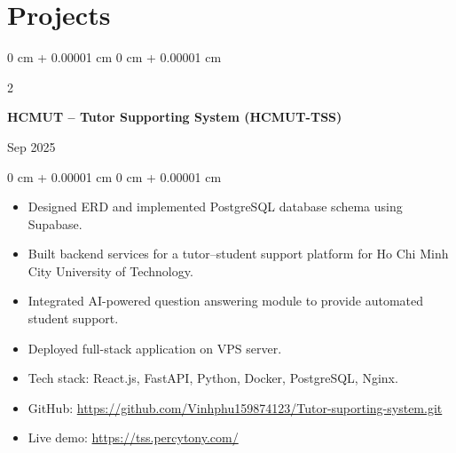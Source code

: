 \documentclass[10pt, letterpaper]{article}
\newenvironment{highlights}{
    \begin{itemize}[
        topsep=0.10 cm,
        parsep=0.10 cm,
        partopsep=0pt,
        itemsep=0pt,
        leftmargin=0 cm + 10pt
    ]
}
{
    \end{itemize}
}
\newenvironment{onecolentry}{
    \begin{adjustwidth}{
        0 cm + 0.00001 cm
    }{
        0 cm + 0.00001 cm
    }
}
{
    \end{adjustwidth}
}
\newenvironment{twocolentry}[2][]{
    \onecolentry
    \def\secondColumn{#2}
    \setcolumnwidth{\fill, 4.5 cm}
    \begin{paracol}{2}
}
{
    \switchcolumn \raggedleft \secondColumn
    \end{paracol}
    \endonecolentry
}
\begin{document}

    \section{Projects}

\begin{twocolentry}{
    Sep 2025
}
    \textbf{HCMUT – Tutor Supporting System (HCMUT-TSS)}
\end{twocolentry}

\vspace{0.10 cm}
\begin{onecolentry}
\begin{highlights}
    \item Designed ERD and implemented PostgreSQL database schema using Supabase.
    \item Built backend services for a tutor–student support platform for Ho Chi Minh City University of Technology.
    \item Integrated AI-powered question answering module to provide automated student support.
    \item Deployed full-stack application on VPS server.
    \item Tech stack: React.js, FastAPI, Python, Docker, PostgreSQL, Nginx.
    \item GitHub: \href{https://github.com/Vinhphu159874123/Tutor-suporting-system.git}{https://github.com/Vinhphu159874123/Tutor-suporting-system.git}
    \item Live demo: \href{https://tss.percytony.com/}{https://tss.percytony.com/}
\end{highlights}

\end{onecolentry}
\vspace{0.1 cm}
        \vspace{0.1 cm}
\end{document}
